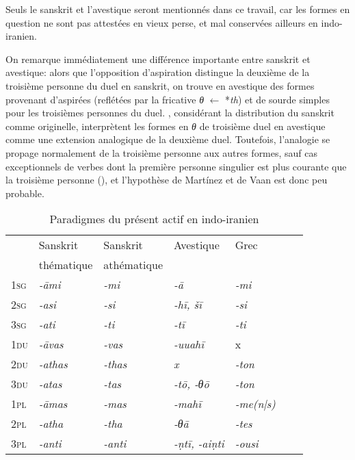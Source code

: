 \documentclass[oldfontcommands,oneside,a4paper,11pt]{article}
\newcommand{\ipa}[1]{{\phon\textit{#1}}} %
\newcommand{\grise}[1]{\cellcolor{lightgray}\textbf{#1}}
\begin{document}
Seuls le sanskrit et l'avestique seront mentionnés dans ce travail, car les formes en question ne sont pas attestées en vieux perse, et mal conservées ailleurs en indo-iranien.

On remarque immédiatement une différence importante entre sanskrit et avestique: alors que l'opposition d'aspiration distingue la deuxième de la troisième personne du duel en sanskrit,  on trouve en avestique des formes provenant d'aspirées (reflétées par la fricative \ipa{θ} $\leftarrow$ *\ipa{th}) et de sourde simples pour les troisièmes personnes du duel. \citet{martinez14avestan}, considérant la distribution du sanskrit comme originelle, interprètent les formes en \ipa{θ} de troisième duel en avestique comme une extension analogique de la deuxième duel. Toutefois, l'analogie se propage normalement de la troisième personne aux autres formes, sauf cas exceptionnels de verbes dont la première personne singulier est plus courante que la troisième personne (\citealt{jacques16ebde}), et l'hypothèse de Martínez et de Vaan est donc peu probable.

\begin{table}[H]
\caption{Paradigmes du présent actif en indo-iranien} \label{tab:actif}
\begin{tabular}{lllllll}
\toprule
 & 	Sanskrit  & 	Sanskrit & 	Avestique & 	Grec & 	\\
 &thématique&athématique&&\\
\midrule
\textsc{1sg} & 	\ipa{-āmi} & 	\ipa{-mi} & 	\ipa{-ā} & 	\ipa{-mi} & 	\\
\textsc{2sg} & 	\ipa{-asi} & 	\ipa{-si} & 	\ipa{-hī, šī} & 	\ipa{-si} & 	\\
\textsc{3sg} & 	\ipa{-ati} & 	\ipa{-ti} & 	\ipa{-tī} & 	\ipa{-ti} & 	\\
\textsc{1du} & 	\ipa{-āvas} & 	\ipa{-vas} & 	\ipa{-uuahī} & 	x & 	\\
\textsc{2du} & 	\ipa{-athas} \grise{}& 	\ipa{-thas} \grise{}& 	\ipa{x} \grise{}& 	\ipa{-ton} & 	\\
\textsc{3du} & 	\ipa{-atas} \grise{}& 	\ipa{-tas} \grise{}& 	\ipa{-tō, -θō} \grise{}& 	\ipa{-ton} & 	\\
\textsc{1pl} & 	\ipa{-āmas} & 	\ipa{-mas} & 	\ipa{-mahī} & 	\ipa{-me(n|s)} & 	\\
\textsc{2pl} & 	\ipa{-atha}\grise{} & 	\ipa{-tha} \grise{}& 	\ipa{-θā} \grise{}& 	\ipa{-tes} & 	\\
\textsc{3pl} & 	\ipa{-anti} & 	\ipa{-anti} & 	\ipa{-ṇtī, -aiṇti} & 	\ipa{-ousi} & 	\\
\bottomrule
\end{tabular}
\end{table}
\end{document}
